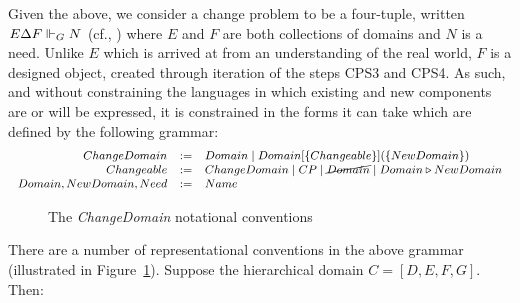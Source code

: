 \documentclass[runningheads,a4paper]{llncs}
\begin{document}
Given the above, we consider a change problem to be a four-tuple, written $E\Delta F\Vdash_G N$ (cf., \cite{hall2016a-design}) where $E$ and $F$ are both collections of domains and $N$ is a need. Unlike $E$ which is arrived at from an understanding of the real world, $F$ is a designed object, created through iteration of the steps CPS3 and CPS4. As such, and without constraining the languages in which existing and new components are or will be expressed, it is constrained in the forms it can take which are defined by the following grammar:
%
\[\footnotesize\begin{array}{rcll}
	ChangeDomain &:=& Domain \mid Domain[\{Changeable\}](\{NewDomain\})\\
	Changeable &:=& ChangeDomain \mid CP \mid \cancel{Domain} \mid Domain \replacedBy NewDomain\\
	Domain, NewDomain, Need &:=& Name
\end{array}\]
%
\begin{figure}
  \caption{The \textit{ChangeDomain} notational conventions}
  \label{fig:notationIllustration}
\end{figure}
There are a number of representational conventions in the above grammar (illustrated in Figure~\ref{fig:notationIllustration}). Suppose the hierarchical domain $C=[D,E,F,G]$. Then:
\end{document}
